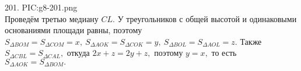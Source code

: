 201. {{PIC:g8-201.png}}\\
Проведём третью медиану $CL.$ У треугольников с общей высотой и одинаковыми основаниями площади равны, поэтому $S_{\Delta BOM}=S_{\Delta COM}=x,\
S_{\Delta AOK}=S_{\Delta COK}=y,\ S_{\Delta BOL}=S_{\Delta AOL}=z.$ Также $S_{\Delta CBL}=S_{\Delta CAL},$ откуда $2x+z=2y+z,$ поэтому $y=x,$ то есть $S_{\Delta AOK}=S_{\Delta BOM}.$\\
